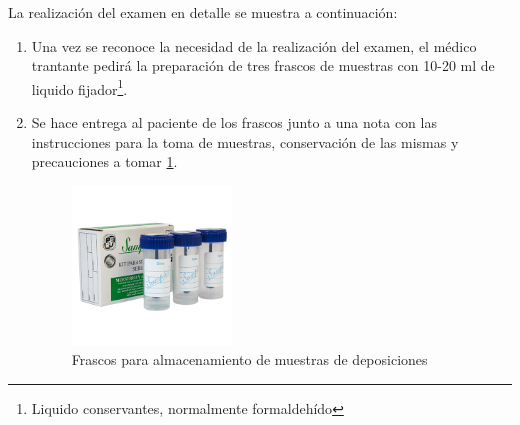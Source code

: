 \documentclass[letter,12pt]{report}
\begin{document}
La realización del examen en detalle se muestra a continuación:\cite{Serial, Serial2}
\begin{enumerate}
    \item Una vez se reconoce la necesidad de la realización del examen, el médico
        trantante pedirá la preparación de tres frascos de muestras con 10-20 ml de
        liquido fijador\footnote{Liquido conservantes, normalmente formaldehído}.
    \item Se hace entrega al paciente de los frascos junto a una nota con las
        instrucciones para la toma de muestras, conservación de las mismas y precauciones
        a tomar \ref{fig:frascos}.
        \begin{figure}[H]
            \centering
            \includegraphics[width=0.4\textwidth]{frascos}
            \caption{Frascos para almacenamiento de muestras de deposiciones}
            \label{fig:frascos}
        \end{figure}


\end{enumerate}
\end{document}
